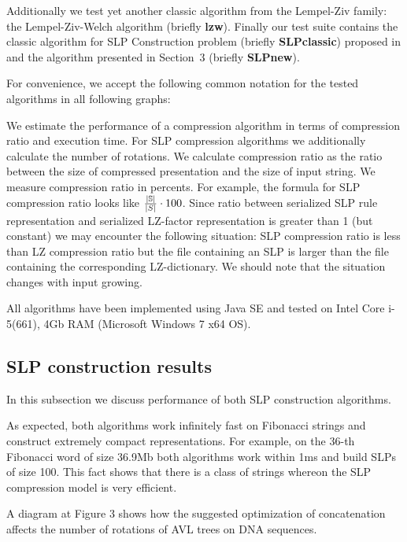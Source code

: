 ﻿\documentclass[10pt, conference, compsocconf]{IEEEtran}
\begin{document}
Additionally we test yet another classic algorithm from the Lempel-Ziv family:
the Lempel-Ziv-Welch algorithm (briefly \textbf{lzw}). Finally our test suite
contains the classic algorithm for SLP Construction problem (briefly
\textbf{SLPclassic}) proposed in \cite{SLPConstruction} and the algorithm
presented in Section~3 (briefly \textbf{SLPnew}).

For convenience, we accept the following common notation for the tested
algorithms in all following graphs:

\algorithmNotations

We estimate the performance of a compression algorithm in terms of compression
ratio and execution time. For SLP compression algorithms we additionally
calculate the number of rotations. We calculate compression ratio as the ratio
between the size of compressed presentation and the size of input string. We
measure compression ratio in percents. For example, the formula for SLP
compression ratio looks like $\frac{|\mathbb{S}|}{|S|} \cdot 100$. Since ratio
between serialized SLP rule representation and serialized LZ-factor
representation is greater than 1 (but constant) we may encounter the following
situation: SLP compression ratio is less than LZ compression ratio but the file
containing an SLP is larger than the file containing the corresponding
LZ-dictionary. We should note that the situation changes with input growing.

All algorithms have been implemented using Java SE and tested on Intel Core
i-5(661), 4Gb RAM (Microsoft Windows 7 x64 OS).

\DNARotations

\subsection{SLP construction results}

In this subsection we discuss performance of both SLP construction algorithms.

As expected, both algorithms work infinitely fast on Fibonacci strings and
construct extremely compact representations. For example, on the 36-th
Fibonacci word of size 36.9Mb both algorithms work within 1ms and build SLPs of
size 100. This fact shows that there is a class of strings whereon the SLP
compression model is very efficient.

\DNASpeedTestInMemory

A diagram at Figure 3 shows how the suggested optimization of concatenation
affects the number of rotations of AVL trees on DNA sequences.
\end{document}
